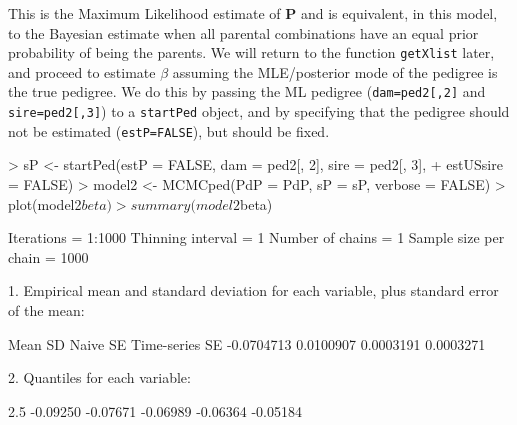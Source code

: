 \documentclass{article}
\begin{document}
This is the Maximum Likelihood estimate of ${\bm P}$ and is equivalent, in this model, to the Bayesian estimate when all parental combinations have an equal prior probability of being the parents.  We will return to the function \texttt{getXlist} later, and proceed to estimate $\beta$ assuming the MLE/posterior mode of the pedigree is the true pedigree.  We do this by passing the ML pedigree (\texttt{dam=ped2[,2]} and \texttt{sire=ped2[,3]}) to a \texttt{startPed} object, and by specifying that the pedigree should not be estimated (\texttt{estP=FALSE}), but should be fixed.

\begin{Schunk}
\begin{Sinput}
> sP <- startPed(estP = FALSE, dam = ped2[, 2], sire = ped2[, 3], 
+     estUSsire = FALSE)
> model2 <- MCMCped(PdP = PdP, sP = sP, verbose = FALSE)
> plot(model2$beta)
> summary(model2$beta)
\end{Sinput}
\begin{Soutput}
Iterations = 1:1000
Thinning interval = 1 
Number of chains = 1 
Sample size per chain = 1000 

1. Empirical mean and standard deviation for each variable,
   plus standard error of the mean:

          Mean             SD       Naive SE Time-series SE 
    -0.0704713      0.0100907      0.0003191      0.0003271 

2. Quantiles for each variable:

    2.5%
-0.09250 -0.07671 -0.06989 -0.06364 -0.05184 
\end{Soutput}
\end{Schunk}
\end{document}
